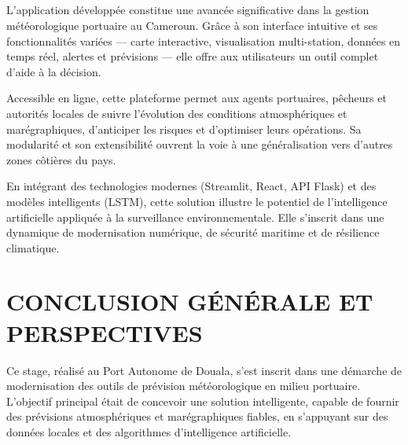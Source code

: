 \documentclass[a4paper,12pt,openany]{report}
\begin{document}
 
\newpage
		\section*{}

	
	\quad L’application développée constitue une avancée significative dans la gestion météorologique portuaire au Cameroun. Grâce à son interface intuitive et ses fonctionnalités variées — carte interactive, visualisation multi-station, données en temps réel, alertes et prévisions — elle offre aux utilisateurs un outil complet d’aide à la décision.
	
	\quad Accessible en ligne, cette plateforme permet aux agents portuaires, pêcheurs et autorités locales de suivre l’évolution des conditions atmosphériques et marégraphiques, d’anticiper les risques et d’optimiser leurs opérations. Sa modularité et son extensibilité ouvrent la voie à une généralisation vers d’autres zones côtières du pays.
	
	\quad En intégrant des technologies modernes (Streamlit, React, API Flask) et des modèles intelligents (LSTM), cette solution illustre le potentiel de l’intelligence artificielle appliquée à la surveillance environnementale. Elle s’inscrit dans une dynamique de modernisation numérique, de sécurité maritime et de résilience climatique.	


\chapter*{ CONCLUSION GÉNÉRALE ET PERSPECTIVES }
\vspace{1cm}
\label{chap:conclusion}

	


\quad Ce stage, réalisé au Port Autonome de Douala, s’est inscrit dans une démarche de modernisation des outils de prévision météorologique en milieu portuaire. L’objectif principal était de concevoir une solution intelligente, capable de fournir des prévisions atmosphériques et marégraphiques fiables, en s’appuyant sur des données locales et des algorithmes d’intelligence artificielle.
\end{document}
